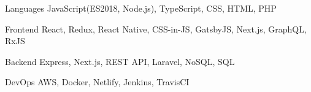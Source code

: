 

\begin{cvskills}

  \cvskill
    {Languages} %
    {JavaScript(ES2018, Node.js), TypeScript, CSS, HTML, PHP} %

  \cvskill
    {Frontend} %
    {React, Redux, React Native, CSS-in-JS, GatsbyJS, Next.js, GraphQL, RxJS} %

  \cvskill
    {Backend} %
    {Express, Next.js, REST API, Laravel, NoSQL, SQL} %

  \cvskill
  {DevOps} %
  {AWS, Docker, Netlify, Jenkins, TravisCI} %

\end{cvskills}
